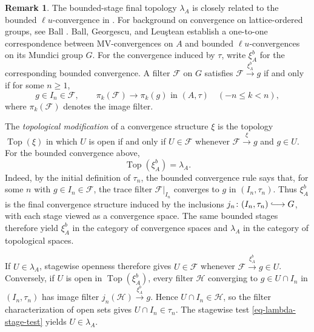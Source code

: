 \documentclass[preprint,3p]{elsarticle}
\theoremstyle{plain}
\theoremstyle{definition}
\newtheorem{rem}[thm]{Remark}
\newcommand{\longhookrightarrow}{\lhook\joinrel\longrightarrow}
\numberwithin{equation}{section}
\begin{document}
\begin{rem}
\label{rem-ball-bounded-convergence}
The bounded-stage final topology $\lambda_A$ is closely related
to the bounded $\ell u$-convergence in \cite{Ball2002}.
For background on convergence on lattice-ordered
groups, see Ball \cite{Ball1980}. 
Ball, Georgescu, and Leu{\c s}tean \cite[Theorem~3.3]{Ball2002}
establish a one-to-one correspondence between MV-convergences on $A$ and
bounded $\ell u$-convergences on its Mundici group $G$.
For the convergence induced by $\tau$, write $\xi_A^b$ for the
corresponding bounded convergence.  A filter $\mathcal F$ on $G$
satisfies $\mathcal F\xrightarrow{\xi_A^b}g$ if and only if
for some $n\geq1$,
\[
 g\in I_n\in\mathcal F,
 \qquad
 \pi_k(\mathcal F)\longrightarrow\pi_k(g)
 \text{ in }(A,\tau)\quad(-n\leq k<n),
\]
where $\pi_k(\mathcal F)$ denotes the image filter.

The \emph{topological modification} of a convergence
structure $\xi$ is the topology $\operatorname{Top}(\xi)$ in which
$U$ is open if and only if $U\in\mathcal F$ whenever
$\mathcal F\xrightarrow{\xi}g$ and $g\in U$.
For the bounded convergence above,
\[
 \operatorname{Top}(\xi_A^b)=\lambda_A.
\]
Indeed, by the initial definition of $\tau_n$, the bounded
convergence rule says that, for some $n$ with $g\in I_n\in\mathcal F$,
the trace filter $\mathcal F|_{I_n}$ converges to $g$ in
$(I_n,\tau_n)$.
Thus $\xi_A^b$ is the final convergence structure induced by the inclusions
$j_n\colon(I_n,\tau_n)\longhookrightarrow G$, with each stage viewed as a
convergence space.  The same bounded stages therefore yield $\xi_A^b$
in the category of convergence spaces and $\lambda_A$ in the category
of topological spaces.

If $U\in\lambda_A$, stagewise openness therefore
gives $U\in\mathcal F$ whenever $\mathcal F\xrightarrow{\xi_A^b}g\in U$.
Conversely, if $U$ is open in $\operatorname{Top}(\xi_A^b)$, every
filter $\mathcal H$ converging to $g\in U\cap I_n$ in $(I_n,\tau_n)$
has image filter $j_n(\mathcal H)\xrightarrow{\xi_A^b}g$.
Hence $U\cap I_n\in\mathcal H$, so the filter characterization of
open sets gives $U\cap I_n\in\tau_n$.
The stagewise test \eqref{eq-lambda-stage-test} yields $U\in\lambda_A$.


\end{rem}
\end{document}
